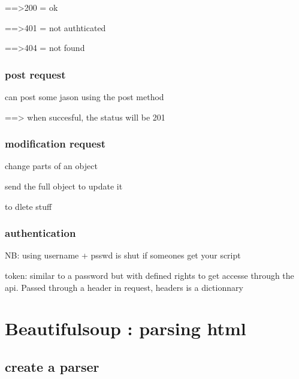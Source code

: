 			==>200 = ok

			==>401 = not authticated

			==>404 = not found

		\subsubsection{post request}

			can post some jason using the post method

			 ==> when succesful, the status will be 201

		\subsubsection{modification request}

			 change parts of an object

			 send the full object to update it

			 to dlete stuff

		\subsubsection{authentication}
			
			NB: using username + psswd is shut if someones get your script

			token: similar to a password but with defined rights to get accesse through the api. Passed through a header in request, headers is a dictionnary
			



\section{Beautifulsoup : parsing html}

	\subsection{create a parser}
		


